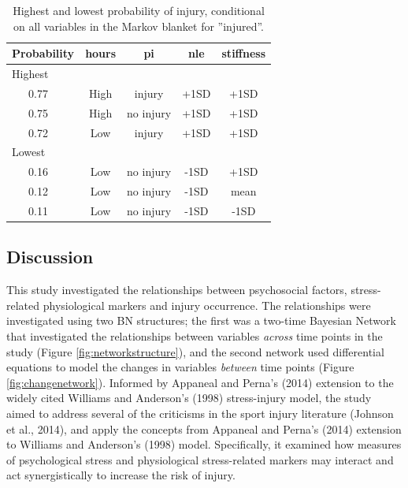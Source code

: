 \documentclass[man,floatsintext]{apa6}
\begin{document}
\begin{table}[H]

\begin{center}
\begin{threeparttable}

\caption{\label{tab:query7}Highest and lowest probability of injury, conditional on all variables in the Markov blanket for ''injured''.}

\begin{tabular}{lcccc}
\toprule
Probability & \multicolumn{1}{c}{hours} & \multicolumn{1}{c}{pi} & \multicolumn{1}{c}{nle} & \multicolumn{1}{c}{stiffness}\\
\midrule
Highest &  &  &  & \\
\ \ \ 0.77 & High & injury & +1SD & +1SD\\
\ \ \ 0.75 & High & no injury & +1SD & +1SD\\
\ \ \ 0.72 & Low & injury & +1SD & +1SD\\
Lowest &  &  &  & \\
\ \ \ 0.16 & Low & no injury & -1SD & +1SD\\
\ \ \ 0.12 & Low & no injury & -1SD & mean\\
\ \ \ 0.11 & Low & no injury & -1SD & -1SD\\
\bottomrule
\end{tabular}

\end{threeparttable}
\end{center}

\end{table}

\hypertarget{discussion}{%
\subsection{Discussion}\label{discussion}}

This study investigated the relationships between psychosocial factors, stress-related physiological markers and injury occurrence.
The relationships were investigated using two BN structures; the first was a two-time Bayesian Network that investigated the relationships between variables \emph{across} time points in the study (Figure \ref{fig:networkstructure}), and the second network used differential equations to model the changes in variables \emph{between} time points (Figure \ref{fig:changenetwork}).
Informed by Appaneal and Perna's (2014) extension to the widely cited Williams and Anderson's (1998) stress-injury model, the study aimed to address several of the criticisms in the sport injury literature (Johnson et al., 2014), and apply the concepts from Appaneal and Perna's (2014) extension to Williams and Anderson's (1998) model.
Specifically, it examined how measures of psychological stress and physiological stress-related markers may interact and act synergistically to increase the risk of injury.
\end{document}
